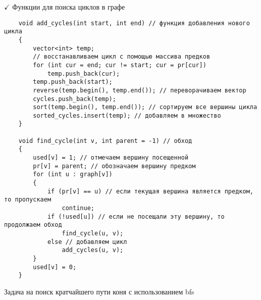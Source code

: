 \documentclass[a4paper, 14pt]{extarticle}
\begin{document}
$\checkmark$ Функции для поиска циклов в графе
\begin{verbatim}
    void add_cycles(int start, int end) // функция добавления нового цикла
    { 
        vector<int> temp;
        // восстанавливаем цикл с помощью массива предков
        for (int cur = end; cur != start; cur = pr[cur])
            temp.push_back(cur);
        temp.push_back(start);
        reverse(temp.begin(), temp.end()); // переворачиваем вектор
        cycles.push_back(temp); 
        sort(temp.begin(), temp.end()); // сортируем все вершины цикла
        sorted_cycles.insert(temp); // добавляем в множество
    }

    void find_cycle(int v, int parent = -1) // обход
    { 
        used[v] = 1; // отмечаем вершину посещенной
        pr[v] = parent; // обозначаем вершину предком
        for (int u : graph[v]) 
        {
            if (pr[v] == u) // если текущая вершина является предком, то пропускаем
                continue; 
            if (!used[u]) // если не посещали эту вершину, то продолжаем обход
                find_cycle(u, v);  
            else // добавляем цикл
                add_cycles(u, v); 
        }
        used[v] = 0;
    }
\end{verbatim}
Задача на поиск кратчайшего пути коня с использованием bfs
\inputminted{cpp}{knights_path.cpp}
\end{document}
